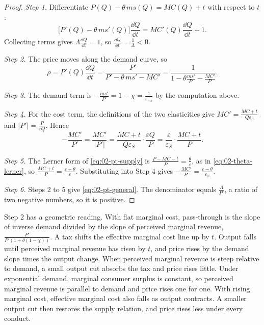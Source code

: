\begin{proof}
\emph{Step 1.} Differentiate $P(Q) - \theta\, ms(Q) = MC(Q) + t$ with respect to $t$:
\begin{equation*}
\bigl[P'(Q) - \theta\, ms'(Q)\bigr]\frac{\dd Q}{\dd t} = MC'(Q)\frac{\dd Q}{\dd t} + 1 .
\end{equation*}
Collecting terms gives $\Lambda\frac{\dd Q}{\dd t} = 1$, so $\frac{\dd Q}{\dd t} = \frac{1}{\Lambda} < 0$.

\emph{Step 2.} The price moves along the demand curve, so
\begin{equation*}
\rho = P'(Q)\frac{\dd Q}{\dd t} = \frac{P'}{P' - \theta\, ms' - MC'} = \frac{1}{1 - \theta\frac{ms'}{P'} - \frac{MC'}{P'}} .
\end{equation*}

\emph{Step 3.} The demand term is $-\frac{ms'}{P'} = 1 - \chi = \frac{1}{\varepsilon_{ms}}$ by the computation
above.

\emph{Step 4.} For the cost term, the definitions of the two elasticities give
$MC' = \frac{MC + t}{Q\varepsilon_S}$ and $\lvert P'\rvert = \frac{P}{\varepsilon Q}$. Hence
\begin{equation*}
-\frac{MC'}{P'} = \frac{MC'}{\lvert P'\rvert} = \frac{MC + t}{Q\varepsilon_S}\cdot\frac{\varepsilon Q}{P}
= \frac{\varepsilon}{\varepsilon_S}\cdot\frac{MC + t}{P} .
\end{equation*}

\emph{Step 5.} The Lerner form of \eqref{eq:02-pt-supply} is $\frac{P - MC - t}{P} = \frac{\theta}{\varepsilon}$,
as in \eqref{eq:02-theta-lerner}, so $\frac{MC + t}{P} = \frac{\varepsilon - \theta}{\varepsilon}$. Substituting into
Step 4 gives $-\frac{MC'}{P'} = \frac{\varepsilon - \theta}{\varepsilon_S}$.

\emph{Step 6.} Steps 2 to 5 give \eqref{eq:02-pt-general}. The denominator equals $\frac{\Lambda}{P'}$, a ratio
of two negative numbers, so it is positive.
\end{proof}

Step 2 has a geometric reading. With flat marginal cost, pass-through is the slope of inverse demand divided by
the slope of perceived marginal revenue, $\frac{P'}{P'(1 + \theta(1 - \chi))}$. A tax shifts the effective
marginal cost line up by $t$. Output falls until perceived marginal revenue has risen by $t$, and price rises by
the demand slope times the output change. When perceived marginal revenue is steep relative to demand, a small
output cut absorbs the tax and price rises little. Under exponential demand, marginal consumer surplus is constant, so
perceived marginal revenue is parallel to demand and price rises one for one. With rising marginal cost,
effective marginal cost also falls as output contracts. A smaller output cut then restores the supply relation,
and price rises less under every conduct.

